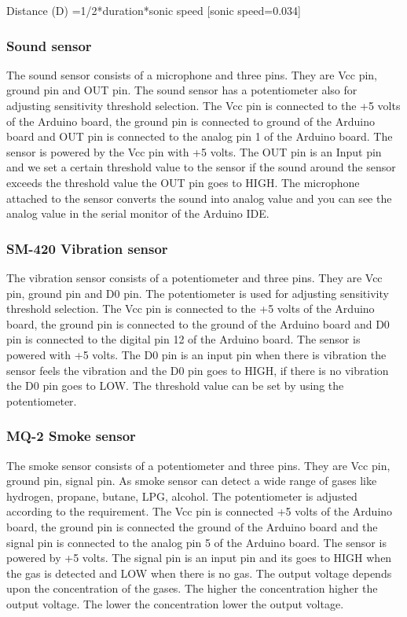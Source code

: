  Distance (D) =1/2*duration*sonic speed [sonic speed=0.034]
 
 \subsubsection{Sound sensor}
 The sound sensor consists of a microphone and three pins. They are Vcc pin, ground pin and OUT pin. The sound sensor has a potentiometer also for adjusting sensitivity threshold selection. The Vcc pin is connected to the +5 volts of the Arduino board, the ground pin is connected to ground of the Arduino board and OUT pin is connected to the analog pin 1 of the
Arduino board. The sensor is powered by the Vcc pin with +5 volts. The OUT pin is an Input pin and we set a certain threshold value to the sensor if the sound around the sensor exceeds the threshold value the OUT pin goes to HIGH. The microphone attached to the sensor converts the sound into analog value and you can see the analog value in the serial monitor of the Arduino
IDE.
\subsubsection{SM-420 Vibration sensor}
The vibration sensor consists of a potentiometer and three pins. They are Vcc pin, ground pin and D0 pin. The potentiometer is used for adjusting sensitivity threshold selection. The Vcc pin is connected to the +5 volts of the Arduino board, the ground pin is connected to the ground of
the Arduino board and D0 pin is connected to the digital pin 12 of the Arduino board. The sensor is powered with +5 volts. The D0 pin is an input pin when there is vibration the sensor feels the vibration and the D0 pin goes to HIGH, if there is no vibration the D0 pin goes to LOW.
The threshold value can be set by using the potentiometer.
\subsubsection{MQ-2 Smoke sensor}
The smoke sensor consists of a potentiometer and three pins. They are Vcc pin, ground pin, signal pin. As smoke sensor can detect a wide range of gases like hydrogen, propane, butane, LPG, alcohol. The potentiometer is adjusted according to the requirement. The Vcc pin is connected +5 volts of the Arduino board, the ground pin is connected the ground of the Arduino board and the signal pin is connected to the analog pin 5 of the Arduino board. The
sensor is powered by +5 volts. The signal pin is an input pin and its goes to HIGH when the gas is detected and LOW when there is no gas. The output voltage depends upon the concentration of the gases. The higher the concentration higher the output voltage. The lower the concentration lower the output voltage.
